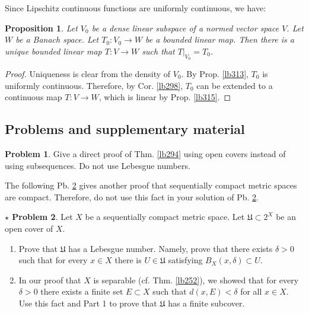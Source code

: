 \documentclass[12pt,b5paper,notitlepage]{article}
\theoremstyle{definition}
\newtheorem{prob}{\color{red}Problem}[section]
\newtheorem{sprob}[prob]{\color{red}$\star$ Problem}
\theoremstyle{plain}
\newtheorem{pp}[df]{Proposition}
\newcommand{\fk}{\mathfrak}
\numberwithin{equation}{section}
\begin{document}
Since Lipschitz continuous functions are uniformly continuous, we have:
\begin{pp}
Let $V_0$ be a dense linear subspace of a normed vector space $V$. Let $W$ be a Banach space. Let $T_0:V_0\rightarrow W$ be a bounded linear map. Then there is a unique bounded linear map $T:V\rightarrow W$ such that $T|_{V_0}=T_0$.
\end{pp}

\begin{proof}
Uniqueness is clear from the density of $V_0$. By Prop. \ref{lb313}, $T_0$ is uniformly continuous. Therefore, by Cor. \ref{lb298}, $T_0$ can be extended to a continuous map $T:V\rightarrow W$, which is linear by Prop. \ref{lb315}.
\end{proof}











\subsection{Problems and supplementary material}

\begin{prob}
Give a direct proof of Thm. \ref{lb294} using open covers instead of using subsequences. Do not use Lebesgue numbers.
\end{prob}


The following Pb. \ref{lb296} gives another proof that sequentially compact metric spaces are compact. Therefore, do not use this fact in your solution of Pb. \ref{lb296}.

\begin{sprob}\label{lb296}
Let $X$ be a sequentially compact metric space. Let $\fk U\subset 2^X$ be an open cover of $X$.
\begin{enumerate}
\item Prove that $\fk U$ has a Lebesgue number. Namely, prove that there exists $\delta>0$ such that for every $x\in X$ there is $U\in\fk U$ satisfying $B_X(x,\delta)\subset U$.
\item In our proof that $X$ is separable (cf. Thm. \ref{lb252}), we showed that for every $\delta>0$ there exists a finite set $E\subset X$ such that $d(x,E)<\delta$ for all $x\in X$. Use this fact and Part 1 to prove that $\fk U$ has a finite subcover.
\end{enumerate}
\end{sprob}
\end{document}
